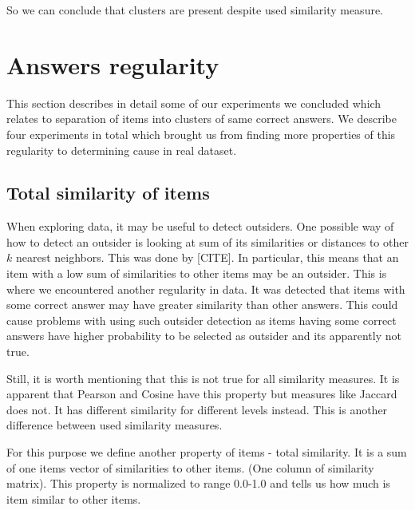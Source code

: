 \documentclass[
  digital, %
  table,   %
  nolof,     %
  nolot,     %
  nocover
]{fithesis3}
\begin{document}
So we can conclude that clusters are present despite used similarity measure.


\section{Answers regularity}\label{evaulation-answers-regularity}

This section describes in detail some of our experiments we concluded which relates to separation of items into clusters of same correct answers. We describe four experiments in total which brought us from finding more properties of this regularity to determining cause in real dataset.


\subsection{Total similarity of items}\label{total-similarity-of-items}

When exploring data, it may be useful to detect outsiders. One possible way of how to detect an outsider is looking at sum of its similarities or distances to other $k$ nearest neighbors. This was done by [CITE]. In particular, this means that an item with a low sum of similarities to other items may be an outsider. This is where we encountered another regularity in data. It was detected that items with some correct answer may have greater similarity than other answers. This could cause problems with using such outsider detection as items having some correct answers have higher probability to be selected as outsider and its apparently not true.

Still, it is worth mentioning that this is not true for all similarity measures. It is apparent that Pearson and Cosine have this property but measures like Jaccard does not. It has different similarity for different levels instead. This is another difference between used similarity measures.

For this purpose we define another property of items - total similarity. It is a sum of one items vector of similarities to other items. (One column of similarity matrix). This property is normalized to range 0.0-1.0 and tells us how much is item similar to other items.
\end{document}
